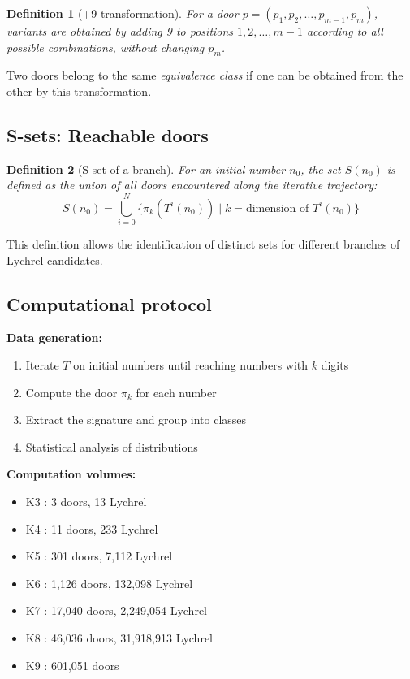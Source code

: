 \documentclass[12pt,a4paper]{article}
\newtheorem{definition}{Definition}[section]
\theoremstyle{remark}
\begin{document}
\begin{definition}[+9 transformation]
For a door $p = (p_1, p_2, \ldots, p_{m-1}, p_m)$, variants are obtained by adding 9 to positions $1,2,\ldots,m-1$ according to all possible combinations, without changing $p_m$.
\end{definition}

Two doors belong to the same \textit{equivalence class} if one can be obtained from the other by this transformation.

\subsection{S-sets: Reachable doors}

\begin{definition}[S-set of a branch]
For an initial number $n_0$, the set $S(n_0)$ is defined as the union of all doors encountered along the iterative trajectory:
\[
S(n_0) = \bigcup_{i=0}^{N} \{\pi_k(T^i(n_0)) \mid k = \text{dimension of } T^i(n_0)\}
\]
\end{definition}

This definition allows the identification of distinct sets for different branches of Lychrel candidates.

\subsection{Computational protocol}

\textbf{Data generation:}
\begin{enumerate}
\item Iterate $T$ on initial numbers until reaching numbers with $k$ digits
\item Compute the door $\pi_k$ for each number
\item Extract the signature and group into classes
\item Statistical analysis of distributions
\end{enumerate}

\textbf{Computation volumes:}
\begin{itemize}
\item K3 : 3 doors, 13 Lychrel
\item K4 : 11 doors, 233 Lychrel
\item K5 : 301 doors, 7,112 Lychrel
\item K6 : 1,126 doors, 132,098 Lychrel
\item K7 : 17,040 doors, 2,249,054 Lychrel
\item K8 : 46,036 doors, 31,918,913 Lychrel
\item K9 : 601,051 doors
\end{itemize}
\end{document}
